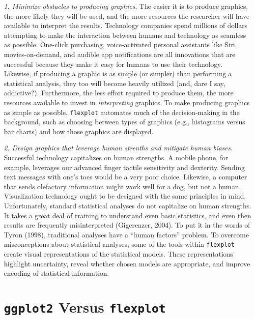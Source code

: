 \documentclass[
  man]{apa6}
\begin{document}
\emph{1. Minimize obstacles to producing graphics.} The easier it is to produce graphics, the more likely they will be used, and the more resources the researcher will have available to interpret the results. Technology companies spend millions of dollars attempting to make the interaction between humans and technology as seamless as possible. One-click purchasing, voice-activated personal assistants like Siri, movies-on-demand, and audible app notifications are all innovations that are successful because they make it easy for humans to use their technology. Likewise, if producing a graphic is as simple (or simpler) than performing a statistical analysis, they too will become heavily utilized (and, dare I say, addictive?). Furthermore, the less effort required to produce them, the more resources available to invest in \emph{interpreting} graphics. To make producing graphics as simple as possible, \texttt{flexplot} automates much of the decision-making in the background, such as choosing between types of graphics (e.g., histograms versus bar charts) and how those graphics are displayed.

\emph{2. Design graphics that leverage human strenths and mitigate human biases.} Successful technology capitalizes on human strengths. A mobile phone, for example, leverages our advanced finger tactile sensitivity and dexterity. Sending text messages with one's toes would be a very poor choice. Likewise, a computer that sends olefactory information might work well for a dog, but not a human. Visualization technology ought to be designed with the same principles in mind. Unfortunately, standard statistical analyses do not capitalize on human strengths. It takes a great deal of training to understand even basic statistics, and even then results are frequently misinterpreted (Gigerenzer, 2004). To put it in the words of Tyron (1998), traditional analyses have a ``human factors'' problem. To overcome misconceptions about statistical analyses, some of the tools within \texttt{flexplot} create visual representations of the statistical models. These representations highlight uncertainty, reveal whether chosen models are appropriate, and improve encoding of statistical information.

\hypertarget{ggplot2-versus-flexplot}{%
\section{\texorpdfstring{\texttt{ggplot2} Versus \texttt{flexplot}}{ggplot2 Versus flexplot}}\label{ggplot2-versus-flexplot}}
\end{document}
